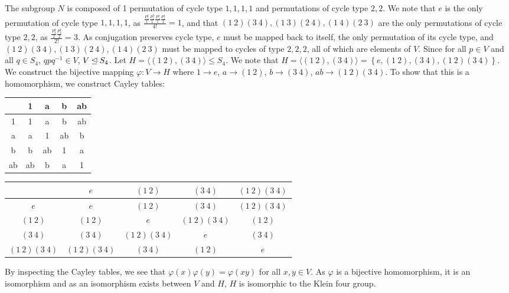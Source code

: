 \documentclass{article}
\begin{document}
The subgroup $N$ is composed of 1 permutation of cycle type $1,1,1,1$ and permutations of cycle type $2,2$. We note that $e$ is the only permutation of cycle type $1,1,1,1$, as $\frac{\frac{P_1^4}{1}\frac{P_1^3}{1}\frac{P_1^1}{1}\frac{P_1^1}{1}}{4!} = 1$, and that $\left(1~2\right)\left(3~4\right), \left(1~3\right)\left(2~4\right), \left(1~4\right)\left(2~3\right)$ are the only permutations of cycle type $2,2$, as $\frac{\frac{P_2^4}{2}\frac{P_2^2}{2}}{2!} = 3$. As conjugation preserves cycle type, $e$ must be mapped back to itself, the only permutation of its cycle type, and $\left(1~2\right)\left(3~4\right), \left(1~3\right)\left(2~4\right), \left(1~4\right)\left(2~3\right)$ must be mapped to cycles of type $2,2,2$, all of which are elements of $V$. Since for all $p \in V$ and all $q \in S_4$, $qpq^{-1} \in V$, $V \unlhd S_4$.
Let $H = \langle \left(1~2\right) , \left(3~4\right) \rangle  \leq S_4$. We note that $H = \langle \left(1~2\right) , \left(3~4\right) \rangle = \left\{e, \left(1~2\right), \left(3~4\right), \left(1~2\right)\left(3~4\right)\right\}$. We construct the bijective mapping $\varphi : V \to H$ where $1 \to e$, $a \to \left(1~2\right)$, $b \to \left(3~4\right)$, $ab \to \left(1~2\right)\left(3~4\right)$. To show that this is a homomorphism, we construct Cayley tables:
\begin{center}
\begin{tabular}{|c||c|c|c|c|}
    \hline
     & 1 & a & b & ab \\
    \hline
    \hline
    1 & 1 & a & b & ab \\
    \hline
    a & a & 1 & ab & b \\
    \hline
    b & b & ab & 1 & a \\
    \hline
    ab & ab & b & a & 1 \\
    \hline
\end{tabular}

\vspace{0.25in}

\begin{tabular}{|c||c|c|c|c|}
    \hline
     & $e$ & $\left(1~2\right)$ & $\left(3~4\right)$ & $\left(1~2\right)\left(3~4\right)$ \\
    \hline
    \hline
    $e$ & $e$ & $\left(1~2\right)$ & $\left(3~4\right)$ & $\left(1~2\right)\left(3~4\right)$ \\
    \hline
    $\left(1~2\right)$ & $\left(1~2\right)$ & $e$ & $\left(1~2\right)\left(3~4\right)$ & $\left(1~2\right)$ \\
    \hline
    $\left(3~4\right)$ & $\left(3~4\right)$ & $\left(1~2\right)\left(3~4\right)$ & $e$ & $\left(3~4\right)$ \\
    \hline
    $\left(1~2\right)\left(3~4\right)$ & $\left(1~2\right)\left(3~4\right)$ & $\left(3~4\right)$ & $\left(1~2\right)$ & $e$ \\
    \hline
\end{tabular}
\end{center}
By inspecting the Cayley tables, we see that $\varphi\left(x\right)\varphi\left(y\right) = \varphi\left(xy\right)$ for all $x, y \in V$. As $\varphi$ is a bijective homomorphism, it is an isomorphism and as an isomorphism exists between $V$ and $H$, $H$ is isomorphic to the Klein four group.
\end{document}
